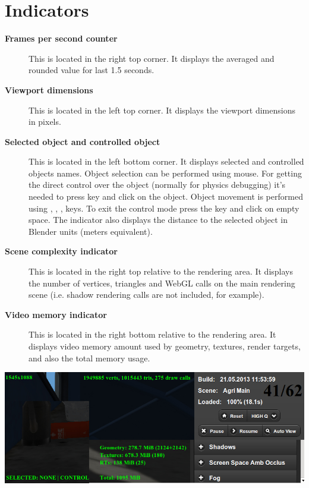 \documentclass[a4paper,12pt,oneside]{sphinxmanual}
\begin{document}
\section{Indicators}
\label{viewer:id5}\begin{description}
\item[{\textbf{Frames per second counter}}] \leavevmode
This is located in the right top corner. It displays the averaged and rounded value for last 1.5 seconds.

\item[{\textbf{Viewport dimensions}}] \leavevmode
This is located in the left top corner. It displays the viewport dimensions in pixels.

\item[{\textbf{Selected object and controlled object}}] \leavevmode
This is located in the left bottom corner. It displays selected and controlled objects names. Object selection can be performed using mouse. For getting the direct control over the object (normally for physics debugging) it's needed to press  key and click on the object. Object movement is performed using , , ,  keys. To exit the control mode press the  key and click on empty space. The indicator also displays the distance to the selected object in Blender units (meters equivalent).

\item[{\textbf{Scene complexity indicator}}] \leavevmode
This is located in the right top relative to the rendering area. It displays the number of vertices, triangles and WebGL calls on the main rendering scene (i.e. shadow rendering calls are not included, for example).

\item[{\textbf{Video memory indicator}}] \leavevmode
This is located in the right bottom relative to the rendering area. It displays video memory amount used by geometry, textures, render targets, and also the total memory usage.

\end{description}

{\hfill\includegraphics[width=1.000\linewidth]{indicators.jpg}\hfill}
\end{document}
